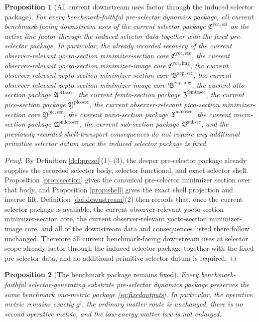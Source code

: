 \documentclass[11pt]{article}
\newcommand{\CompletedMetric}{g^{\sharp}}
\newcommand{\SubSectionPackage}{\mathfrak V^{\mathrm{subsec}}}
\newcommand{\MicroSectionPackage}{\mathfrak W^{\mathrm{microsec}}}
\newcommand{\NanoSectionPackage}{\mathfrak X^{\mathrm{nanosec}}}
\newcommand{\PicoSectionPackage}{\mathfrak Y^{\mathrm{picosec}}}
\newcommand{\PicoMinSectionCore}{\mathfrak Y^{\mathrm{pic,sec}}}
\newcommand{\FemtoSectionPackage}{\mathfrak Z^{\mathrm{femtosec}}}
\newcommand{\AttoSectionPackage}{\mathfrak A^{\mathrm{attosec}}}
\newcommand{\ZeptoImageCore}{\mathfrak B^{\mathrm{zep,img}}}
\newcommand{\ZeptoMinSectionCore}{\mathfrak B^{\mathrm{zep,sec}}}
\newcommand{\YoctoImageCore}{\mathfrak C^{\mathrm{yoc,img}}}
\newcommand{\YoctoMinSectionCore}{\mathfrak C^{\mathrm{yoc,sec}}}
\newcommand{\YoctoSelectorPackage}{\mathfrak C^{\mathrm{yoc,sel}}}
\newtheorem{proposition}{Proposition}
\begin{document}
\begin{proposition}[All current downstream uses factor through the induced selector package]
\label{prop:downstream}
For every benchmark-faithful pre-selector dynamics package, all current benchmark-facing downstream uses of the current selector package \(\YoctoSelectorPackage\) on the active line factor through the induced selector data together with the fixed pre-selector package. In particular, the already recorded recovery of the current observer-relevant yocto-section minimizer-section core \(\YoctoMinSectionCore\), the current observer-relevant yocto-section minimizer-image core \(\YoctoImageCore\), the current observer-relevant zepto-section minimizer-section core \(\ZeptoMinSectionCore\), the current observer-relevant zepto-section minimizer-image core \(\ZeptoImageCore\), the current atto-section package \(\AttoSectionPackage\), the current femto-section package \(\FemtoSectionPackage\), the current pico-section package \(\PicoSectionPackage\), the current observer-relevant pico-section minimizer-section core \(\PicoMinSectionCore\), the current nano-section package \(\NanoSectionPackage\), the current micro-section package \(\MicroSectionPackage\), the current sub-section package \(\SubSectionPackage\), and the previously recorded shell-transport consequences do not require any additional primitive selector datum once the induced selector package is fixed.
\end{proposition}

\begin{proof}
By Definition \ref{def:presel}(1)--(3), the deeper pre-selector package already supplies the recorded selector body, selector functional, and exact selector shell. Proposition \ref{prop:section} gives the canonical pre-selector minimizer section over that body, and Proposition \ref{prop:shell} gives the exact shell projection and inverse lift. Definition \ref{def:downstream}(2) then records that, once the current selector package is available, the current observer-relevant yocto-section minimizer-section core, the current observer-relevant yocto-section minimizer-image core, and all of the downstream data and consequences listed there follow unchanged. Therefore all current benchmark-facing downstream uses at selector scope already factor through the induced selector package together with the fixed pre-selector data, and no additional primitive selector datum is required.
\end{proof}

\begin{proposition}[The benchmark package remains fixed]
\label{prop:benchmark}
Every benchmark-faithful selector-generating substrate pre-selector dynamics package preserves the same benchmark one-metric package \eqref{eq:fixedoutputs}. In particular, the operative metric remains exactly \(\CompletedMetric\), the ordinary matter route is unchanged, there is no second operative metric, and the low-energy matter law is not enlarged.
\end{proposition}
\end{document}
